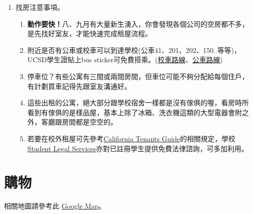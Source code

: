 \documentclass[10pt,a4paper]{book}
\begin{document}
\begin{CJK}{UTF8}{bkai}
\begin{enumerate}
\item 找房注意事項。
    \begin{enumerate}
    \item \textbf{動作要快！}八、九月有大量新生湧入，你會發現各個公司的空房都不多，是先找好室友，才能快速完成租屋流程。
    \item 附近是否有公車或校車可以到達學校(公車41、201、202、150..等等)，UCSD學生證貼上bus sticker可免費搭乘。(\href{http://www.ucsdbus.com/map}{校車路線}、\href{http://transportation.ucsd.edu/alternatives/transit/index.html}{公車路線})
    \item 停車位？有些公寓有三間或兩間房間，但車位可能不夠分配給每個住戶，有計劃買車記得先跟室友溝通好。
    \item 這些出租的公寓，絕大部分跟學校宿舍一樣都是沒有傢俱的喔，看房時所看到有傢俱的是樣品屋，基本上除了冰箱、洗衣機這類的大型電器會附之外，客廳跟房間都是空空的。
    \item 若要在校外租屋可先參考\href{ http://cosb.countyofsb.org/uploadedFiles/Tenant%
    }{California Tenants Guide}的相關規定，學校\href{http://sls.ucsd.edu/}{Student Legal Services}亦對已註冊學生提供免費法律諮詢，可多加利用。
    \end{enumerate}
    
\end{enumerate}

\section{購物}\label{sec:shopping}
相關地圖請參考此 \href{https://mapsengine.google.com/map/edit?mid=zQtEEXrWDims.kkyPg0OFPdmM}{Google Map}。


\end{CJK}
\end{document}
